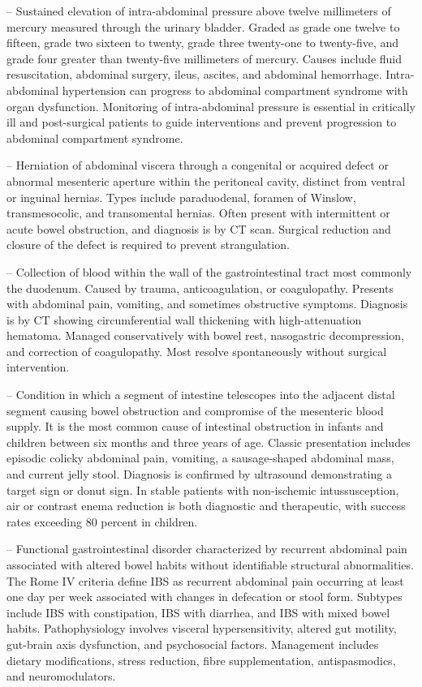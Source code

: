 -- Sustained elevation of intra-abdominal pressure above twelve millimeters of mercury measured through the urinary bladder. Graded as grade one twelve to fifteen, grade two sixteen to twenty, grade three twenty-one to twenty-five, and grade four greater than twenty-five millimeters of mercury. Causes include fluid resuscitation, abdominal surgery, ileus, ascites, and abdominal hemorrhage. Intra-abdominal hypertension can progress to abdominal compartment syndrome with organ dysfunction. Monitoring of intra-abdominal pressure is essential in critically ill and post-surgical patients to guide interventions and prevent progression to abdominal compartment syndrome.

-- Herniation of abdominal viscera through a congenital or acquired defect or abnormal mesenteric aperture within the peritoneal cavity, distinct from ventral or inguinal hernias. Types include paraduodenal, foramen of Winslow, transmesocolic, and transomental hernias. Often present with intermittent or acute bowel obstruction, and diagnosis is by CT scan. Surgical reduction and closure of the defect is required to prevent strangulation.

-- Collection of blood within the wall of the gastrointestinal tract most commonly the duodenum. Caused by trauma, anticoagulation, or coagulopathy. Presents with abdominal pain, vomiting, and sometimes obstructive symptoms. Diagnosis is by CT showing circumferential wall thickening with high-attenuation hematoma. Managed conservatively with bowel rest, nasogastric decompression, and correction of coagulopathy. Most resolve spontaneously without surgical intervention.

-- Condition in which a segment of intestine telescopes into the adjacent distal segment causing bowel obstruction and compromise of the mesenteric blood supply. It is the most common cause of intestinal obstruction in infants and children between six months and three years of age. Classic presentation includes episodic colicky abdominal pain, vomiting, a sausage-shaped abdominal mass, and current jelly stool. Diagnosis is confirmed by ultrasound demonstrating a target sign or donut sign. In stable patients with non-ischemic intussusception, air or contrast enema reduction is both diagnostic and therapeutic, with success rates exceeding 80 percent in children.

-- Functional gastrointestinal disorder characterized by recurrent abdominal pain associated with altered bowel habits without identifiable structural abnormalities. The Rome IV criteria define IBS as recurrent abdominal pain occurring at least one day per week associated with changes in defecation or stool form. Subtypes include IBS with constipation, IBS with diarrhea, and IBS with mixed bowel habits. Pathophysiology involves visceral hypersensitivity, altered gut motility, gut-brain axis dysfunction, and psychosocial factors. Management includes dietary modifications, stress reduction, fibre supplementation, antispasmodics, and neuromodulators.

